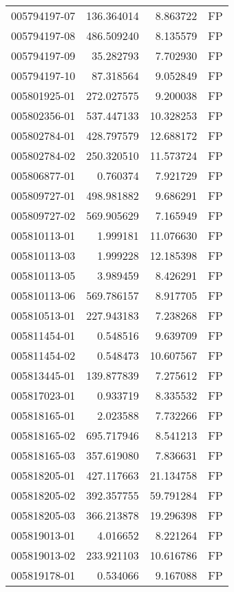 \begin{tabular}{lrrl}
005794197-07 &  136.364014 &     8.863722 &   FP \\
005794197-08 &  486.509240 &     8.135579 &   FP \\
005794197-09 &   35.282793 &     7.702930 &   FP \\
005794197-10 &   87.318564 &     9.052849 &   FP \\
005801925-01 &  272.027575 &     9.200038 &   FP \\
005802356-01 &  537.447133 &    10.328253 &   FP \\
005802784-01 &  428.797579 &    12.688172 &   FP \\
005802784-02 &  250.320510 &    11.573724 &   FP \\
005806877-01 &    0.760374 &     7.921729 &   FP \\
005809727-01 &  498.981882 &     9.686291 &   FP \\
005809727-02 &  569.905629 &     7.165949 &   FP \\
005810113-01 &    1.999181 &    11.076630 &   FP \\
005810113-03 &    1.999228 &    12.185398 &   FP \\
005810113-05 &    3.989459 &     8.426291 &   FP \\
005810113-06 &  569.786157 &     8.917705 &   FP \\
005810513-01 &  227.943183 &     7.238268 &   FP \\
005811454-01 &    0.548516 &     9.639709 &   FP \\
005811454-02 &    0.548473 &    10.607567 &   FP \\
005813445-01 &  139.877839 &     7.275612 &   FP \\
005817023-01 &    0.933719 &     8.335532 &   FP \\
005818165-01 &    2.023588 &     7.732266 &   FP \\
005818165-02 &  695.717946 &     8.541213 &   FP \\
005818165-03 &  357.619080 &     7.836631 &   FP \\
005818205-01 &  427.117663 &    21.134758 &   FP \\
005818205-02 &  392.357755 &    59.791284 &   FP \\
005818205-03 &  366.213878 &    19.296398 &   FP \\
005819013-01 &    4.016652 &     8.221264 &   FP \\
005819013-02 &  233.921103 &    10.616786 &   FP \\
005819178-01 &    0.534066 &     9.167088 &   FP \\

\end{tabular}

